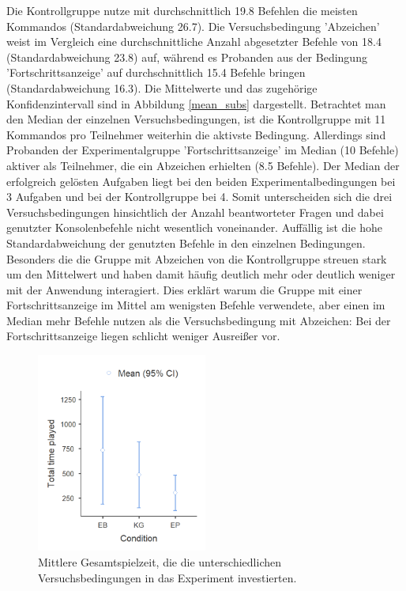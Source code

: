 Die Kontrollgruppe nutze mit durchschnittlich 19.8 Befehlen die meisten Kommandos (Standardabweichung 26.7). Die Versuchsbedingung 'Abzeichen' weist im Vergleich eine durchschnittliche Anzahl abgesetzter Befehle von 18.4 (Standardabweichung 23.8) auf, während es Probanden aus der Bedingung 'Fortschrittsanzeige' auf durchschnittlich 15.4 Befehle bringen (Standardabweichung 16.3). Die Mittelwerte und das zugehörige Konfidenzintervall sind in Abbildung \ref{mean_subs} dargestellt. Betrachtet man den Median der einzelnen Versuchsbedingungen, ist die Kontrollgruppe mit 11 Kommandos pro Teilnehmer weiterhin die aktivste Bedingung. Allerdings sind Probanden der Experimentalgruppe 'Fortschrittsanzeige' im Median (10 Befehle) aktiver als Teilnehmer, die ein Abzeichen erhielten (8.5 Befehle). Der Median der erfolgreich gelösten Aufgaben liegt bei den beiden Experimentalbedingungen bei 3 Aufgaben und bei der Kontrollgruppe bei 4. Somit unterscheiden sich die drei Versuchsbedingungen hinsichtlich der Anzahl beantworteter Fragen und dabei genutzter Konsolenbefehle nicht wesentlich voneinander. Auffällig ist die hohe Standardabweichung der genutzten Befehle in den einzelnen Bedingungen. Besonders die die Gruppe mit Abzeichen von die Kontrollgruppe streuen stark um den Mittelwert und haben damit häufig deutlich mehr oder deutlich weniger mit der Anwendung interagiert. Dies erklärt warum die Gruppe mit einer Fortschrittsanzeige im Mittel am wenigsten Befehle verwendete, aber einen im Median mehr Befehle nutzen als die Versuchsbedingung mit Abzeichen: Bei der Fortschrittsanzeige liegen schlicht weniger Ausreißer vor.  

\begin{figure}[htbp]
    \centering
    \includegraphics[width=0.5\textwidth]{img/auswertung/mean_time.png}
    \caption{Mittlere Gesamtspielzeit, die die unterschiedlichen Versuchsbedingungen in das Experiment investierten.}
    \label{mean_time}
\end{figure}

